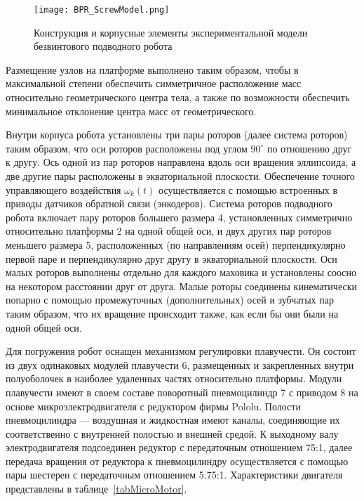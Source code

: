 \begin{figure}[h]
	\centering
	\texttt{[image: BPR\_ScrewModel.png]}%
	\caption{Конструкция и корпусные элементы экспериментальной модели безвинтового подводного робота}
	\label{constr_BPR}
\end{figure}

Размещение узлов на платформе выполнено таким образом, чтобы в максимальной степени обеспечить симметричное расположение масс относительно геометрического центра тела, а также по возможности обеспечить минимальное отклонение центра масс от геометрического.

Внутри корпуса робота установлены три пары роторов (далее система роторов) таким образом, что оси роторов расположены под углом $90^\circ$ по отношению друг к другу. Ось одной из пар роторов направлена вдоль оси вращения эллипсоида, а две другие пары расположены в экваториальной плоскости. Обеспечение точного управляющего воздействия $\omega_k (t)$ осуществляется с помощью встроенных в приводы датчиков обратной связи (энкодеров). Система роторов подводного робота включает пару роторов большего размера 4, установленных симметрично относительно платформы 2 на одной общей оси, и двух других пар роторов меньшего размера 5, расположенных (по направлениям осей) перпендикулярно первой паре и перпендикулярно друг другу в экваториальной плоскости. Оси малых роторов выполнены отдельно для каждого маховика и установлены соосно на некотором расстоянии друг от друга. Малые роторы соединены кинематически попарно с помощью промежуточных (дополнительных) осей и зубчатых пар таким образом, что их вращение происходит также, как если бы они были на одной общей оси.

Для погружения робот оснащен механизмом регулировки плавучести. Он состоит из двух одинаковых модулей плавучести 6, размещенных и закрепленных внутри полуоболочек в наиболее удаленных частях относительно платформы. Модули плавучести имеют в своем составе поворотный пневмоцилиндр 7 с приводом 8 на основе микроэлектродвигателя с редуктором фирмы Pololu. Полости пневмоцилиндра --- воздушная и жидкостная имеют каналы, соединяющие их соответственно с внутренней полостью и внешней средой. К выходному валу электродвигателя подсоединен редуктор с передаточным отношением 75:1, далее передача вращения от редуктора к пневмоцилиндру осуществляется с помощью пары шестерен с передаточным отношением 5.75:1. Характеристики двигателя представлены в таблице~\ref{tabMicroMotor}. 

